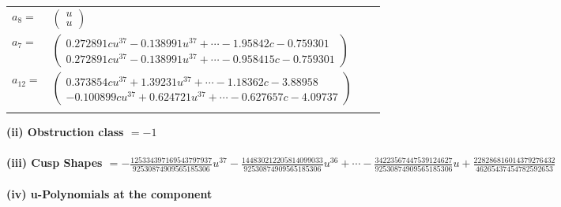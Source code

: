 \documentclass[1p]{elsarticle_modified}
\theoremstyle{definition}
\begin{document}
\begin{tabular}{m{7pt} m{180pt} m{7pt} m{180pt} }
\flushright $a_{8}=$&$\begin{pmatrix}u\\u\end{pmatrix}$ \\
\flushright $a_{7}=$&$\begin{pmatrix}0.272891 c u^{37}-0.138991 u^{37}+\cdots-1.95842 c-0.759301\\0.272891 c u^{37}-0.138991 u^{37}+\cdots-0.958415 c-0.759301\end{pmatrix}$ \\
\flushright $a_{12}=$&$\begin{pmatrix}0.373854 c u^{37}+1.39231 u^{37}+\cdots-1.18362 c-3.88958\\-0.100899 c u^{37}+0.624721 u^{37}+\cdots-0.627657 c-4.09737\end{pmatrix}$\\&\end{tabular}
\flushleft \textbf{(ii) Obstruction class $= -1$}\\~\\
\flushleft \textbf{(iii) Cusp Shapes $= -\frac{125334397169543797937}{92530874909565185306} u^{37}-\frac{144830212205814099033}{92530874909565185306} u^{36}+\cdots-\frac{34223567447539124627}{92530874909565185306} u+\frac{228286816014379276432}{46265437454782592653}$}\\~\\
\newpage\renewcommand{\arraystretch}{1}
\flushleft \textbf{(iv) u-Polynomials at the component}\newline \\
\end{document}
